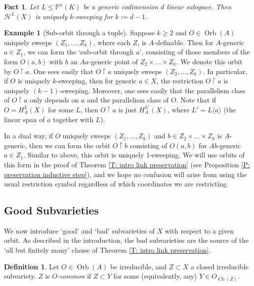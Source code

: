 \documentclass{amsart}
\newtheorem{fact}[theorem]{Fact}
\theoremstyle{definition}
\newtheorem{definition}[theorem]{Definition}
\newtheorem{example}[theorem]{Example}
\begin{document}
\begin{fact}
    Let $L\leq\mathbb P^n(K)$ be a generic codimension $d$ linear subspace. Then $\mathcal H^L(X)$ is uniquely $k$-sweeping for $k:=d-1$. 
\end{fact}

\begin{example}[Sub-orbit through a tuple] Suppose $k\geq 2$ and $O\in\operatorname{Orb}(A)$ uniquely sweeps $(Z_1,...,Z_k)$, where each $Z_i$ is $A$-definable. Then for $A$-generic $a\in Z_1$, we can form the `sub-orbit through $a$', consisting of those members of the form $O(a,b)$ with $b$ an $Aa$-generic point of $Z_2\times...\times Z_k$. We denote this orbit by $O\restriction a$. One sees easily that $O\restriction a$ uniquely sweeps $(Z_2,...,Z_k)$. In particular, if $O$ is uniquely $k$-sweeping, then for generic $a\in X$, the restriction $O\restriction a$ is uniquely $(k-1)$-sweeping. Moreover, one sees easily that the parallelism class of $O\restriction a$ only depends on $a$ and the parallelism class of $O$. Note that if $O=H_A^L(X)$ for some $L$, then $O\restriction a$ is just $H_A^{L'}(X)$, where $L'=L\langle a\rangle$ (the linear span of $a$ together with $L$). 

In a dual way, if $O$ uniquely sweeps $(Z_1,...,Z_k)$ and $b\in Z_2\times...\times Z_k$ is $A$-generic, then we can form the orbit $O\restriction b$ consisting of $O(a,b)$ for $Ab$-generic $a\in Z_1$. Similar to above, this orbit is uniquely 1-sweeping. We will use orbits of this form in the proof of Theorem \ref{T: intro link preservation} (see Proposition \ref{P: preservation inductive step}), and we hope no confusion will arise from using the usual restriction symbol regardless of which coordinates we are restricting. 
    
\end{example}

\subsection{Good Subvarieties}

We now introduce `good' and `bad' subvarieties of $X$ with respect to a given orbit. As described in the introduction, the bad subvarieties are the source of the `all but finitely many' clause of Theorem \ref{T: intro link preservation}.

\begin{definition}
    Let $O\in\operatorname{Orb}(A)$ be irreducible, and $Z\subset X$ a closed irreducible subvariety. $Z$ is \textit{$O$-common} if $Z\subset Y$ for some (equivalently, any) $Y\in O_{\operatorname{Cb}(Z)}$.
\end{definition}
\end{document}
